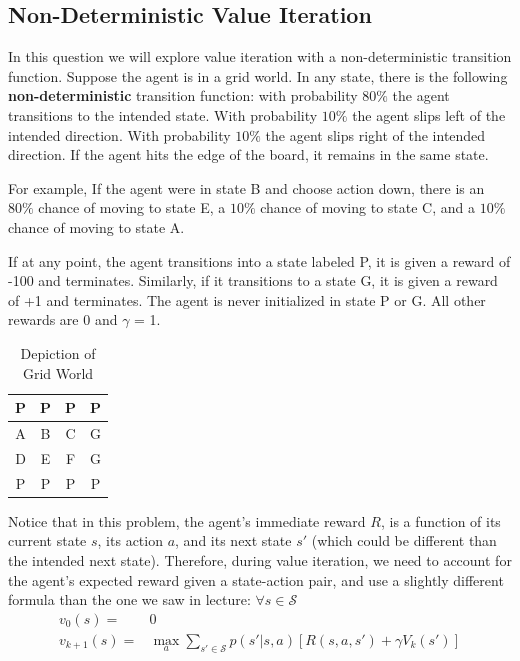 \documentclass[11pt,addpoints,answers]{exam}
\begin{document}
\clearpage
\subsection{Non-Deterministic Value Iteration}
    In this question we will explore value iteration with a non-deterministic transition function. Suppose the agent is in a grid world. In any state, there is the following \textbf{non-deterministic} transition function: with probability $80\%$ the agent transitions to the intended state. With probability $10\%$ the agent slips left of the intended direction. With probability $10\%$ the agent slips right of the intended direction. If the agent hits the edge of the board, it remains in the same state.
    
    For example, If the agent were in state B and choose action down, there is an $80\%$ chance of moving to state E, a $10\%$ chance of moving to state C, and a $10\%$ chance of moving to state A. 
    
    If at any point, the agent transitions into a state labeled P, it is given a reward of -100 and terminates. Similarly, if it transitions to a state G, it is given a reward of +1 and terminates. The agent is never initialized in state P or G. All other rewards are 0 and $\gamma$ = 1.
    \begin{table}[H]
    \begin{center}
      \begin{tabular}{ | c | c | c | c | }
        \hline
        P & P & P & P \\ \hline
        A & B & C & G \\ \hline
        D & E & F & G \\ \hline
        P & P & P & P \\ \hline
      \end{tabular}
      \caption{Depiction of Grid World}
    \end{center}
    \end{table}
    Notice that in this problem, the agent's immediate reward $R$, is a function of its current state $s$, its action $a$, and its next state $s'$ (which could be different than the intended next state). Therefore, during value iteration, we need to account for the agent's expected reward given a state-action pair, and use a slightly different formula than the one we saw in lecture: $\forall s \in \mathcal{S}$
    \begin{align*}
        v_0(s) =& 0\\
        v_{k+1}(s) =& \max_a \sum_{s' \in \mathcal{S}} p (s'|s,a)\left[R(s,a,s')+\gamma V_k(s')\right]
    \end{align*}
    
\end{document}
